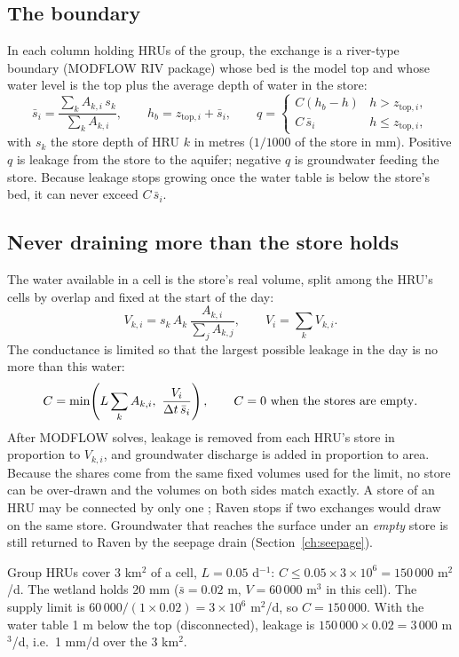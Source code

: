 \subsection{The boundary}
In each column holding HRUs of the group, the exchange is a river-type boundary (MODFLOW RIV package) whose bed is the
model top and whose water level is the top plus the average depth of water in the store:
\begin{equation}
\bar s_i=\frac{\sum_kA_{k,i}\,s_k}{\sum_kA_{k,i}},\qquad h_b=z_{\mathrm{top},i}+\bar s_i,
\qquad q=\begin{cases}C\left(h_b-h\right) & h>z_{\mathrm{top},i},\\ C\,\bar s_i & h\le z_{\mathrm{top},i},\end{cases}
\end{equation}
with $s_k$ the store depth of HRU $k$ in metres ($1/1000$ of the store in mm). Positive $q$ is leakage from the store to
the aquifer; negative $q$ is groundwater feeding the store. Because leakage stops growing once the water table is below
the store's bed, it can never exceed $C\,\bar s_i$.

\subsection{Never draining more than the store holds}
The water available in a cell is the store's real volume, split among the HRU's cells by overlap and fixed at the start
of the day:
\begin{equation}
V_{k,i}=s_k\,A_k\,\frac{A_{k,i}}{\sum_jA_{k,j}},\qquad V_i=\sum_kV_{k,i} .
\end{equation}
The conductance is limited so that the largest possible leakage in the day is no more than this water:
\begin{equation}
C=\min\!\left(L\sum_kA_{k,i},\ \frac{V_i}{\dt\,\bar s_i}\right),\qquad C=0\ \text{when the stores are empty}.
\end{equation}
After MODFLOW solves, leakage is removed from each HRU's store in proportion to $V_{k,i}$, and groundwater discharge is
added in proportion to area. Because the shares come from the same fixed volumes used for the limit, no store can be
over-drawn and the volumes on both sides match exactly. A store of an HRU may be connected by only one
; Raven stops if two exchanges would draw on the same store. Groundwater that reaches the surface under an \emph{empty} store is
still returned to Raven by the seepage drain (Section~\ref{ch:seepage}).
\begin{example}
Group HRUs cover 3 km$^2$ of a cell, $L=0.05$ d$^{-1}$: $C\le0.05\times3\times10^6=150\,000$ m$^2$/d. The wetland holds
20 mm ($\bar s=0.02$ m, $V=60\,000$ m$^3$ in this cell). The supply limit is $60\,000/(1\times0.02)=3\times10^6$ m$^2$/d, so
$C=150\,000$. With the water table 1 m below the top (disconnected), leakage is $150\,000\times0.02=3\,000$ m$^3$/d, i.e.\
1 mm/d over the 3 km$^2$.
\end{example}

